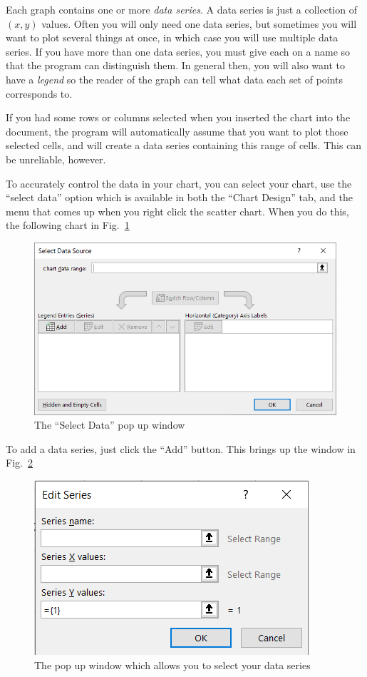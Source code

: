 \documentclass[10pt]{article}
\begin{document}
Each graph contains one or more \textit{data series}.
A data series is just a collection of $\left( x,y \right)$ values.
Often you will only need one data series, but sometimes you will want to plot several things at once, in which case you will use multiple data series.
If you have more than one data series, you must give each on a name so that the program can distinguish them.
In general then, you will also want to have a \textit{legend} so the reader of the graph can tell what data each set of points corresponds to. 

If you had some rows or columns selected when you inserted the chart into the document, the program will automatically assume that you want to plot those selected cells, and will create a data series containing this range of cells.
This can be unreliable, however. 

To accurately control the data in your chart, you can select your chart, use the ``select data'' option which is available in both the ``Chart Design'' tab, and the menu that comes up when you right click the scatter chart.
When you do this, the following chart in Fig.~\ref{fig:images_select-data}

\begin{figure}[htpb]
	\centering
	\includegraphics[width=0.5\linewidth]{images/select-data.png}
	\caption{The ``Select Data'' pop up window}%
	\label{fig:images_select-data}
\end{figure}

To add a data series, just click the ``Add'' button.
This brings up the window in Fig.~\ref{fig:images_data-series-selector}

\begin{figure}[htpb]
	\centering
	\includegraphics[width=0.5\linewidth]{images/data-series-selector.png}
	\caption{The pop up window which allows you to select your data series}%
	\label{fig:images_data-series-selector}
\end{figure}
\end{document}

